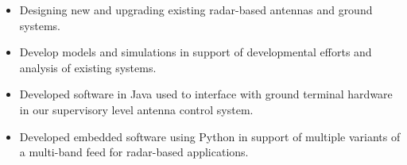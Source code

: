 \documentclass[10pt,a4paper]{altacv}
\begin{document}

\begin{fullwidth}
\makecvheader
\end{fullwidth}




\begin{itemize}
\item Designing new and upgrading existing radar-based antennas and ground systems.  
\item Develop models and simulations in support of developmental efforts and analysis of existing systems.
\end{itemize}
\medskip

\begin{itemize}
\item Developed software in Java used to interface with ground terminal hardware in our supervisory level antenna control system.
\item Developed embedded software using Python in support of multiple variants of a multi-band feed for radar-based applications.
\end{itemize}
\medskip
\end{document}
